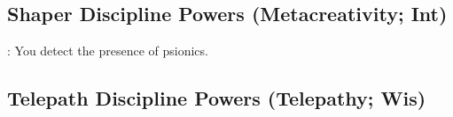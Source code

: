 \subsection{Shaper Discipline Powers {\normalsize(Metacreativity; Int)}}
\begin{enumerate*}
\item
\item {}: You detect the presence of psionics.
\item
\item
\item
\item
\item
\item
\item
\end{enumerate*}



\subsection{Telepath Discipline Powers {\normalsize(Telepathy; Wis)}}
\begin{enumerate*}
\item
\item
\item
\item
\item
\item
\item
\item
\item
\end{enumerate*}